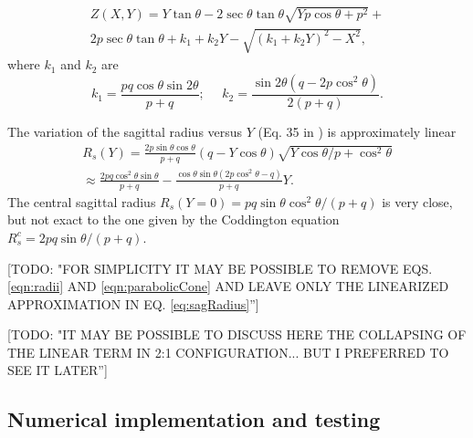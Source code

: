 \documentclass{iucr}              %
\newcommand{\todo}[1]{{\color{red}[TODO: "#1'']}}
\begin{document}
\begin{multline}
\label{eqn:parabolicCone}
Z(X,Y) = Y \tan\theta - 2 \sec\theta \tan\theta
\sqrt{Y p \cos\theta + p^2} + \\
2 p \sec\theta \tan\theta +
k_1 + k_2 Y - \sqrt{(k_1 + k_2 Y)^2 - X^2},
\end{multline}
where $k_1$ and $k_2$ are
\begin{equation}
k_1 = \frac{p q \cos\theta \sin2\theta}{p+q};~~~~~~
k_2 = \frac{\sin2\theta(q-2p\cos^2\theta)}{2(p+q)}.
\end{equation}


The variation of the sagittal radius versus $Y$  (Eq. 35 in \cite{part2}) is approximately linear
\begin{multline}
\label{eq:sagRadius}
R_s(Y) = \frac{2  p \sin\theta \cos\theta}{p + q} (q - Y \cos\theta)   \sqrt{Y \cos\theta / p + \cos^2\theta} \\
\approx 
\frac{2p q \cos^2\theta \sin\theta  }{p + q} - 
\frac{\cos\theta \sin\theta (2 p \cos^2\theta - q)}{p + q} Y.
\end{multline}
The central sagittal radius $R_s(Y=0)=p q \sin\theta \cos^2\theta/ (p+q)$ is very close, but not exact to the one given by the Coddington equation $R_s^c=2 p q \sin\theta / (p+q)$.

\todo{FOR SIMPLICITY IT MAY BE POSSIBLE TO REMOVE EQS. \ref{eqn:radii} AND \ref{eqn:parabolicCone} AND LEAVE ONLY THE LINEARIZED APPROXIMATION IN EQ. \ref{eq:sagRadius}} 

\todo{IT MAY BE POSSIBLE TO DISCUSS HERE THE COLLAPSING OF THE LINEAR TERM IN 2:1 CONFIGURATION... BUT I PREFERRED TO SEE IT LATER}


\subsection{Numerical implementation and testing}
\label{sec:oasys}
\end{document}

